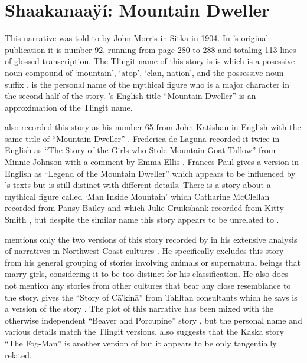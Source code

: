 
\resetexcnt
\chapter{Shaakanaaÿí: Mountain Dweller}\label{ch:92-mountain-dweller}

This narrative was told to \citeauthor{swanton:1909} by  John Morris in Sitka in 1904.
In \citeauthor{swanton:1909}’s original publication it is number 92, running from page 280 to 288 and totaling 113 lines of glossed transcription.
The Tlingit name of this story is is  which is a posessive noun compound of  ‘mountain’,  ‘atop’,  ‘clan, nation’, and the possessive noun suffix .
 is the personal name of the mythical figure who is a major character in the second half of the story.
\citeauthor{swanton:1909}’s English title “Mountain Dweller” is an approximation of the Tlingit name.

\citeauthor{swanton:1909} also recorded this story as his number 65 from  John Katishan in English with the same title of “Mountain Dweller” \parencite[222–224]{swanton:1909}.
Frederica de Laguna recorded it twice in English as “The Story of the Girls who Stole Mountain Goat Tallow” from  Minnie Johnson with a comment by  Emma Ellis \parencite[892–893]{de-laguna:1972}.
Frances Paul  gives a version in English as “Legend of the Mountain Dweller” \parencite[70–71]{paul:1944} which appears to be influenced by \citeauthor{swanton:1909}’s texts but is still distinct with different details.
There is a story about a mythical figure called  ‘Man Inside Mountain’ which Catharine McClellan recorded from  Pansy Bailey \parencite[692–695]{mcclellan-cruikshank:2007c} and which Julie Cruikshank recorded from  Kitty Smith \parencite[103–107]{smith:1982}, but despite the similar name this story appears to be unrelated to .

\citeauthor{boas:1916} mentions only the two versions of this story recorded by \citeauthor{swanton:1909} in his extensive analysis of narratives in Northwest Coast cultures \parencite[758]{boas:1916}.
He specifically excludes this story from his general grouping of stories involving animals or supernatural beings that marry girls, considering it to be too distinct for his classification.
He also does not mention any stories from other cultures that bear any close resemblance to the  story.
\citeauthor{teit:1919} gives the “Story of Cā′kinā” from Tahltan consultants which he says is a version of the  story \parencite[244–246]{teit:1919}.
The plot of this narrative has been mixed with the otherwise independent “Beaver and Porcupine” story \parencites[cf.][446–448]{swanton:1908a}[724–727]{boas:1916}[496, 621–622]{mcclellan-cruikshank:2007c}, but the personal name and various details match the Tlingit versions.
\citeauthor{teit:1917} also suggests that the Kaska story “The Fog-Man” \parencite[466–467]{teit:1917} is another version of  but it appears to be only tangentially related.

